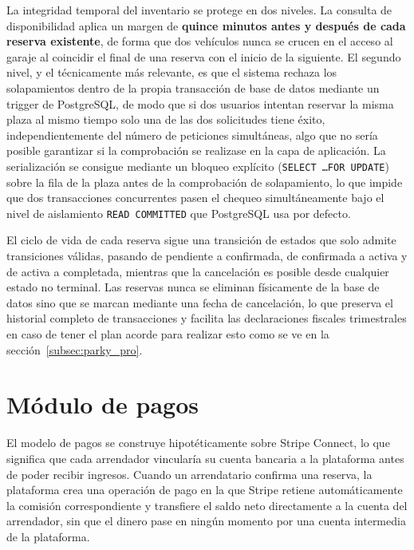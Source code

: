 La integridad temporal del inventario se protege en dos niveles. La consulta de disponibilidad aplica un margen de \textbf{quince minutos antes y después de cada reserva existente}, de forma que dos vehículos nunca se crucen en el acceso al garaje al coincidir el final de una reserva con el inicio de la siguiente. El segundo nivel, y el técnicamente más relevante, es que el sistema rechaza los solapamientos dentro de la propia transacción de base de datos mediante un trigger de PostgreSQL, de modo que si dos usuarios intentan reservar la misma plaza al mismo tiempo solo una de las dos solicitudes tiene éxito, independientemente del número de peticiones simultáneas, algo que no sería posible garantizar si la comprobación se realizase en la capa de aplicación. La serialización se consigue mediante un bloqueo explícito (\texttt{SELECT \ldots FOR UPDATE}) sobre la fila de la plaza antes de la comprobación de solapamiento, lo que impide que dos transacciones concurrentes pasen el chequeo simultáneamente bajo el nivel de aislamiento \texttt{READ COMMITTED} que PostgreSQL usa por defecto.

El ciclo de vida de cada reserva sigue una transición de estados que solo admite transiciones válidas, pasando de pendiente a confirmada, de confirmada a activa y de activa a completada, mientras que la cancelación es posible desde cualquier estado no terminal. Las reservas nunca se eliminan físicamente de la base de datos sino que se marcan mediante una fecha de cancelación, lo que preserva el historial completo de transacciones y facilita las declaraciones fiscales trimestrales en caso de tener el plan acorde para realizar esto como se ve en la sección~\ref{subsec:parky_pro}.

\section{Módulo de pagos}
\label{sec:impl_pagos}

El modelo de pagos se construye hipotéticamente sobre Stripe Connect, lo que significa que cada arrendador vincularía su cuenta bancaria a la plataforma antes de poder recibir ingresos. Cuando un arrendatario confirma una reserva, la plataforma crea una operación de pago en la que Stripe retiene automáticamente la comisión correspondiente y transfiere el saldo neto directamente a la cuenta del arrendador, sin que el dinero pase en ningún momento por una cuenta intermedia de la plataforma.

